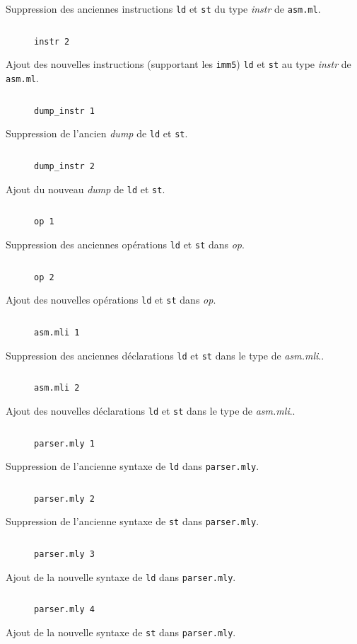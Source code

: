 \documentclass[twoside, 12pt, a4paper]{article}
\newcommand{\fmo}[4]{
\begin{figure}[!h]
    \centering
    \inputminted[firstline=#3, lastline=#4]{ocaml}{#1}
    \caption{\texttt{#2}}
\end{figure}
}
\begin{document}
Suppression des anciennes instructions \texttt{ld} et \texttt{st} du type \textit{instr} de \texttt{asm.ml}.

\fmo{../patch/digcomp_jb.patch.dbu}{instr 2}{18}{19}

Ajout des nouvelles instructions (supportant les \texttt{imm5}) \texttt{ld} et \texttt{st} au type \textit{instr} de \texttt{asm.ml}.

\fmo{../patch/digcomp_jb.patch.dbu}{dump\_instr 1}{40}{43}

Suppression de l'ancien \textit{dump} de \texttt{ld} et \texttt{st}.

\fmo{../patch/digcomp_jb.patch.dbu}{dump\_instr 2}{48}{51}

Ajout du nouveau \textit{dump} de \texttt{ld} et \texttt{st}.

\clearpage

\fmo{../patch/digcomp_jb.patch.dbu}{op 1}{78}{81}

Suppression des anciennes opérations \texttt{ld} et \texttt{st} dans \textit{op}. 

\fmo{../patch/digcomp_jb.patch.dbu}{op 2}{86}{95}

Ajout des nouvelles opérations \texttt{ld} et \texttt{st} dans \textit{op}.

\fmo{../patch/digcomp_jb.patch.dbu}{asm.mli 1}{118}{119}

Suppression des anciennes déclarations \texttt{ld} et \texttt{st} dans le type de \textit{asm.mli}.. 

\fmo{../patch/digcomp_jb.patch.dbu}{asm.mli 2}{122}{123}

Ajout des nouvelles déclarations \texttt{ld} et \texttt{st} dans le type de \textit{asm.mli}.. 

\fmo{../patch/digcomp_jb.patch.dbu}{parser.mly 1}{194}{194}

Suppression de l'ancienne syntaxe de \texttt{ld} dans \texttt{parser.mly}.

\clearpage

\fmo{../patch/digcomp_jb.patch.dbu}{parser.mly 2}{196}{196}

Suppression de l'ancienne syntaxe de \texttt{st} dans \texttt{parser.mly}.

\fmo{../patch/digcomp_jb.patch.dbu}{parser.mly 3}{200}{200}

Ajout de la nouvelle syntaxe de \texttt{ld} dans \texttt{parser.mly}.

\fmo{../patch/digcomp_jb.patch.dbu}{parser.mly 4}{202}{202}

Ajout de la nouvelle syntaxe de \texttt{st} dans \texttt{parser.mly}.
\end{document}
